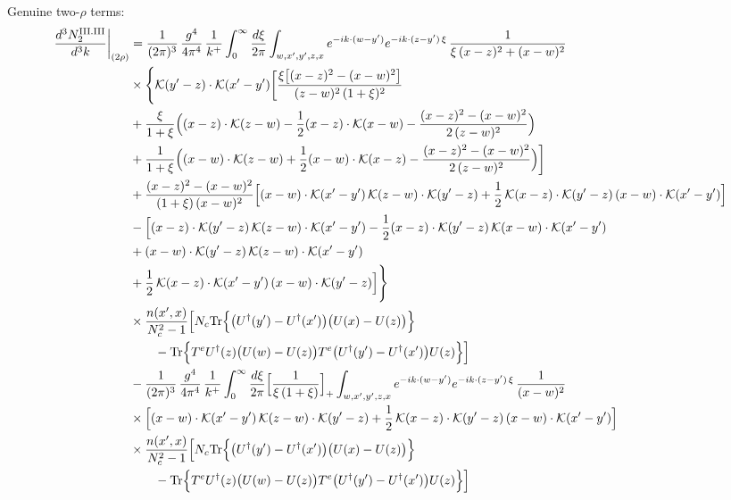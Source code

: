 \documentclass[9pt]{article}
\numberwithin{equation}{section}
\begin{document}
Genuine two-$\rho$ terms:
\begin{align}
\frac{d^{3}N^{\rm III.III}_{2}}{d^{3}k}\bigg|_{(2\rho)} & =\frac{1}{(2\pi)^{3}}\,\frac{g^{4}}{4\pi^{4}}\,\frac{1}{k^{+}}\int_{0}^{\infty}\frac{d\xi}{2\pi}\int_{w,x',y',z,x}e^{-ik\cdot(w-y')}e^{-ik\cdot(z-y')\,\xi}\,\frac{1}{\xi\,(x-z)^{2}+(x-w)^{2}}\notag\\
&\times\Bigg\{\mathcal{K}(y'-z)\cdot\mathcal{K}(x'-y')\bigg[\frac{\xi\big[(x-z)^{2}-(x-w)^{2}\big]}{(z-w)^{2}\,(1+\xi)^{2}}\notag\\
&+\frac{\xi}{1+\xi}\Big((x-z)\cdot\mathcal{K}(z-w)-\frac{1}{2}(x-z)\cdot\mathcal{K}(x-w)-\frac{(x-z)^{2}-(x-w)^{2}}{2\,(z-w)^{2}}\Big)\notag\\
&+\frac{1}{1+\xi}\Big((x-w)\cdot\mathcal{K}(z-w)+\frac{1}{2}(x-w)\cdot\mathcal{K}(x-z)-\frac{(x-z)^{2}-(x-w)^{2}}{2\,(z-w)^{2}}\Big)\bigg]\notag\\
&+\frac{(x-z)^{2}-(x-w)^{2}}{(1+\xi)\,(x-w)^{2}}\Big[(x-w)\cdot\mathcal{K}(x'-y')\,\mathcal{K}(z-w)\cdot\mathcal{K}(y'-z)+\frac{1}{2}\,\mathcal{K}(x-z)\cdot\mathcal{K}(y'-z)\,(x-w)\cdot\mathcal{K}(x'-y')\Big]\notag\\
&-\Big[(x-z)\cdot\mathcal{K}(y'-z)\,\mathcal{K}(z-w)\cdot\mathcal{K}(x'-y')-\frac{1}{2}(x-z)\cdot\mathcal{K}(y'-z)\,\mathcal{K}(x-w)\cdot\mathcal{K}(x'-y')\notag\\
&+(x-w)\cdot\mathcal{K}(y'-z)\,\mathcal{K}(z-w)\cdot\mathcal{K}(x'-y')\notag\\
&+\frac{1}{2}\,\mathcal{K}(x-z)\cdot\mathcal{K}(x'-y')\,(x-w)\cdot\mathcal{K}(y'-z)\Big]\Bigg\}\notag\\
&\times\frac{n(x',x)}{N_{c}^{2}-1}\Big[N_{c}{\rm Tr}\Big\{\big(U^{\dagger}(y')-U^{\dagger}(x')\big)\big(U(x)-U(z)\big)\Big\}\notag\\&\qquad-{\rm Tr}\Big\{T^{e}U^{\dagger}(z)\big(U(w)-U(z)\big)T^{e}\big(U^{\dagger}(y')-U^{\dagger}(x')\big)U(z)\Big\}\Big]\notag\\
&-\frac{1}{(2\pi)^{3}}\,\frac{g^{4}}{4\pi^{4}}\,\frac{1}{k^{+}}\int_{0}^{\infty}\frac{d\xi}{2\pi}\Big[\frac{1}{\xi\,(1+\xi)}\Big]_{+}\int_{w,x',y',z,x}e^{-ik\cdot(w-y')}e^{-ik\cdot(z-y')\,\xi}\,\frac{1}{(x-w)^{2}}\notag\\
&\times\Big[(x-w)\cdot\mathcal{K}(x'-y')\,\mathcal{K}(z-w)\cdot\mathcal{K}(y'-z)+\frac{1}{2}\,\mathcal{K}(x-z)\cdot\mathcal{K}(y'-z)\,(x-w)\cdot\mathcal{K}(x'-y')\Big]\notag\\
&\times\frac{n(x',x)}{N_{c}^{2}-1}\Big[N_{c}{\rm Tr}\Big\{\big(U^{\dagger}(y')-U^{\dagger}(x')\big)\big(U(x)-U(z)\big)\Big\}\notag\\&\qquad-{\rm Tr}\Big\{T^{e}U^{\dagger}(z)\big(U(w)-U(z)\big)T^{e}\big(U^{\dagger}(y')-U^{\dagger}(x')\big)U(z)\Big\}\Big]\notag\\

\end{align}
\end{document}
